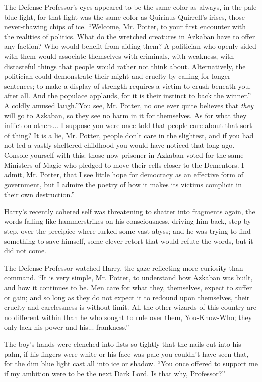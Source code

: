 The Defense Professor's eyes appeared to be the same color as always, in
the pale blue light, for that light was the same color as Quirinus
Quirrell's irises, those never-thawing chips of ice. ``Welcome, Mr.
Potter, to your first encounter with the realities of politics. What do
the wretched creatures in Azkaban have to offer any faction? Who would
benefit from aiding them? A politician who openly sided with them would
associate themselves with criminals, with weakness, with distasteful
things that people would rather not think about. Alternatively, the
politician could demonstrate their might and cruelty by calling for
longer sentences; to make a display of strength requires a victim to
crush beneath you, after all. And the populace applauds, for it is their
instinct to back the winner.'' A coldly amused laugh.''You see, Mr.
Potter, no one ever quite believes that \emph{they} will go to Azkaban,
so they see no harm in it for themselves. As for what they inflict on
others... I suppose you were once told that people care about that
sort of thing? It is a lie, Mr. Potter, people don't care in the
slightest, and if you had not led a vastly sheltered childhood you would
have noticed that long ago. Console yourself with this: those now
prisoner in Azkaban voted for the same Ministers of Magic who pledged to
move their cells closer to the Dementors. I admit, Mr. Potter, that I
see little hope for democracy as an effective form of government, but I
admire the poetry of how it makes its victims complicit in their own
destruction.''

Harry's recently cohered self was threatening to shatter into fragments
again, the words falling like hammerstrikes on his consciousness,
driving him back, step by step, over the precipice where lurked some
vast abyss; and he was trying to find something to save himself, some
clever retort that would refute the words, but it did not come.

The Defense Professor watched Harry, the gaze reflecting more curiosity
than command. ``It is very simple, Mr. Potter, to understand how Azkaban
was built, and how it continues to be. Men care for what they,
themselves, expect to suffer or gain; and so long as they do not expect
it to redound upon themselves, their cruelty and carelessness is without
limit. All the other wizards of this country are no different within
than he who sought to rule over them, You-Know-Who; they only lack his
power and his... frankness.''

The boy's hands were clenched into fists so tightly that the nails cut
into his palm, if his fingers were white or his face was pale you
couldn't have seen that, for the dim blue light cast all into ice or
shadow. ``You once offered to support me if my ambition were to be the
next Dark Lord. Is that why, Professor?''

